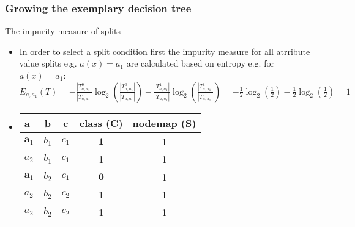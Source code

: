 \documentclass[smaller, proffesionalfonts]{beamer}
\def\bm{\boldsymbol}
\begin{document}
\begin{frame}
\frametitle{Growing the exemplary decision tree}
\begin{block}{The impurity measure of splits}
\begin{itemize}
\item
In order to select a split condition first the impurity measure for all atrribute value splits e.g. $a(x)=a_1$ are calculated based on entropy e.g. for $a(x)=a_1$:
$E_{a,a_1}(T)= 
-\frac{|T^{0}_{a,a_1}|}{|T_{a,a_1}|}\log_2(\frac{|T^{0}_{a,a_1}|}{|T_{a,a_1}|}) 
-\frac{|T^{1}_{a,a_1}|}{|T_{a,a_1}|}\log_2(\frac{|T^{1}_{a,a_1}|}{|T_{a,a_1}|}) =
-\frac{1}{2}\log_2(\frac{1}{2})-\frac{1}{2}\log_2(\frac{1}{2})=1$
\item[\ ]
\begin{center}
{\sf
   \begin{tabular}{|p{3mm}||c|c||c||c|}
   \hline 
   a & b & c & class (C) & nodemap (S)\\
   \hline
   \hline
    $\bm a_1$ & $b_1$ & $c_1$ & $\bm 1$ & 1 \\
   \hline
    $a_2$ & $b_1$ & $c_1$ & 1 & 1 \\
   \hline
    $\bm a_1$ & $b_2$ & $c_1$ & $\bm 0$ & 1 \\
   \hline
    $a_2$ & $b_2$ & $c_2$ & 1 & 1 \\
   \hline
    $a_2$ & $b_2$ & $c_2$ & 1 & 1 \\
   \hline
   \end{tabular}
}
\end{center}
\end{itemize}
\end{block}
\end{frame}
\end{document}
